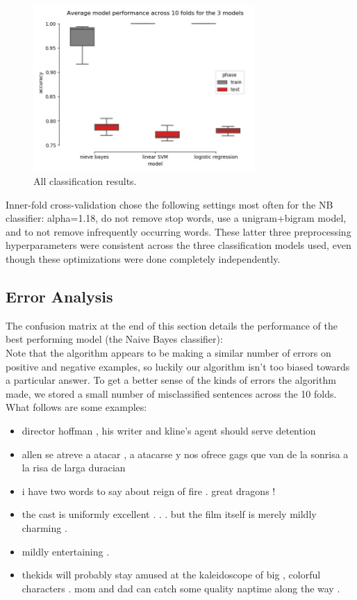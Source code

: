 \documentclass{amsart}
\theoremstyle{definition}
\theoremstyle{remark}
\numberwithin{equation}{section}
\begin{document}
\begin{figure}
  \caption{All classification results.}
  \centering
    \includegraphics[width=0.75\textwidth]{accs}
\end{figure}

Inner-fold cross-validation chose the following settings most often for the NB
classifier:  alpha=1.18, do not remove stop words, use a unigram+bigram model,
and to not remove infrequently occurring words. These latter three preprocessing
hyperparameters were consistent across the three classification models used,
even though these optimizations were done completely independently.

\subsection{Error Analysis}

The confusion matrix at the end of this section details the performance of the
best performing model (the Naive Bayes classifier): \\

Note that the algorithm appears to be making a similar number of errors on
positive and negative examples, so luckily our algorithm isn't too biased towards
a particular answer. To get a better sense of the kinds of errors the algorithm
made, we stored a small number of misclassified sentences across the 10 folds.
What follows are some examples: \\

\begin{itemize}
    \item{director hoffman , his writer and kline's agent should serve detention}
    \item{allen se atreve a atacar , a atacarse y nos ofrece gags que van de la sonrisa a la risa de larga duracian}
    \item{i have two words to say about reign of fire . great dragons ! }
    \item{the cast is uniformly excellent . . . but the film itself is merely mildly charming .}
    \item{mildly entertaining .}
    \item{thekids will probably stay amused at the kaleidoscope of big , colorful characters . mom and dad can catch some quality naptime along the way .}
\end{itemize}
\end{document}
